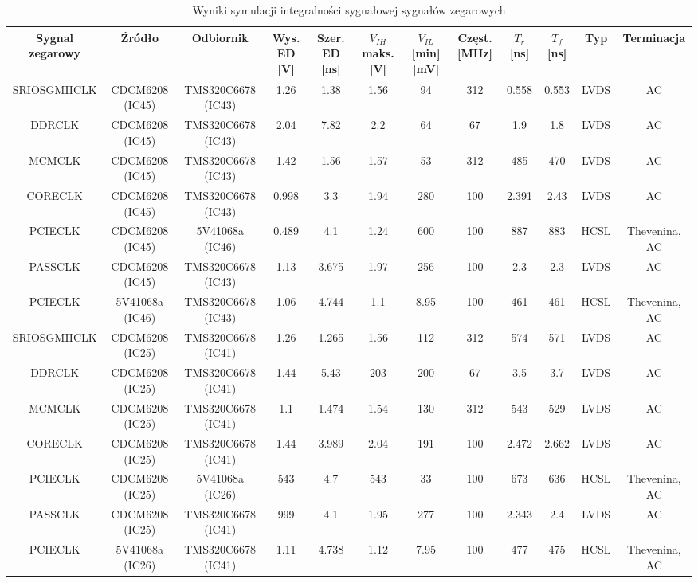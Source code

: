 \begin{sidewaystable}[htb]
\centering
\scriptsize

	\caption{Wyniki symulacji integralności sygnałowej sygnałów zegarowych}
    \begin{tabular}{c|c|c|c|c|c|c|c|c|c|c|c}
	\toprule
    \textbf{Sygnal zegarowy} & \textbf{Źródło} & \textbf{Odbiornik} & \textbf{Wys. ED [V]} & \textbf{Szer. ED [ns]} & \textbf{$V_{IH}$ maks. [V]} & \textbf{$V_{IL}$ [min] [mV]}  & 		\textbf{Częst. [MHz]}	& 	\textbf{$T_{r}$ [ns]} 		& 	\textbf{$T_{f}$[ns]}    	& \textbf{Typ} & \textbf{Terminacja}\\
    \midrule
   SRIOSGMIICLK 	& 		CDCM6208 (IC45) 		& 	 	TMS320C6678 (IC43)  	&	1.26		& 	1.38	&	1.56	&	94	&	312	& 	0.558	 	&	0.553 		&		LVDS		&		AC\\	
   DDRCLK	 	& 		CDCM6208 (IC45)		& 	 	TMS320C6678 (IC43)  	&	2.04		& 	7.82	&	2.2	&	64	&	67	& 	1.9	 	&	1.8		&		LVDS		&		AC\\
   MCMCLK	 	& 		CDCM6208 (IC45) 		& 	 	TMS320C6678 (IC43)  	&	1.42		&	1.56	&	1.57	&	53	&	312	&	485		&	470		&		LVDS		&		AC\\
   CORECLK	 	& 		CDCM6208 (IC45) 		& 	 	TMS320C6678 (IC43)  	&	0.998		&	3.3	&	1.94	&	280	&	100	&	2.391		&	2.43		&		LVDS		&		AC\\
   PCIECLK	 	& 		CDCM6208 (IC45) 		& 	 	5V41068a   (IC46)   	&	0.489		& 	4.1	&	1.24	&	600	&	100	&	887		&	883		&		HCSL		&		Thevenina, AC\\
   PASSCLK	 	& 		CDCM6208 (IC45) 		& 	 	TMS320C6678 (IC43)  	&	1.13		&	3.675	&	1.97	&	256	&	100	&	2.3		&	2.3		&		LVDS		&		AC\\
   PCIECLK	 	& 		5V41068a   (IC46) 		& 	 	TMS320C6678 (IC43)  	&	1.06		&	4.744	&	1.1	&	8.95	&	100	&	461		&	461		&		HCSL		&		Thevenina, AC\\
\hline
\hline
   SRIOSGMIICLK 	& 		CDCM6208 (IC25) 		& 	 	TMS320C6678 (IC41)  	&	1.26		&	1.265	&	1.56	&	112	&	312	&	574		&	571		&		LVDS		&		AC\\	
   DDRCLK	 	& 		CDCM6208 (IC25)		& 	 	TMS320C6678 (IC41)  	&	1.44		&	5.43	&	203	&	200	&	67	&	3.5		&	3.7		&		LVDS		&		AC\\
   MCMCLK	 	& 		CDCM6208 (IC25) 		& 	 	TMS320C6678 (IC41)  	&	1.1		&	1.474	&	1.54	&	130	&	312	&	543		&	529		&		LVDS		&		AC\\
   CORECLK	 	& 		CDCM6208 (IC25) 		& 	 	TMS320C6678 (IC41)  	&	1.44		&	3.989	&	2.04	&	191	&	100	&	2.472		&	2.662		&		LVDS		&		AC\\
   PCIECLK	 	& 		CDCM6208 (IC25) 		& 	 	5V41068a   (IC26)   	&	543		&	4.7	&	543	&	33	&	100	&	673		&	636		&		HCSL		&		Thevenina, AC\\
   PASSCLK	 	& 		CDCM6208 (IC25) 		& 	 	TMS320C6678 (IC41)  	&	999		&	4.1	&	1.95	&	277	&	100	&	2.343		&	2.4		&		LVDS		&		AC\\
   PCIECLK	 	& 		5V41068a   (IC26) 		& 	 	TMS320C6678 (IC41)  	&	1.11		&	4.738	&	1.12	&	7.95	&	100	&	477		&	475		&		HCSL		&		Thevenina, AC\\
							


    \end{tabular}
	\label{tbl:clock_hlx}
\end{sidewaystable}
